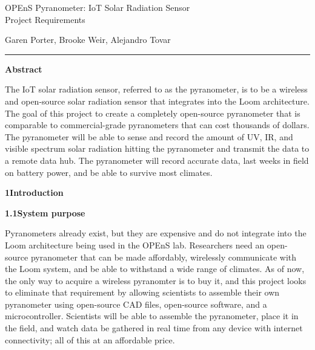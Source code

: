\documentclass[10pt,draftclsnofoot,onecolumn,letterpaper]{article}
\begin{document}
\begin{Center}
{\fontsize{14pt}{16.8pt}\selectfont OPEnS Pyranometer: IoT Solar Radiation Sensor\\ Project Requirements\par}
\end{Center}\par
    
\begin{Center}
Garen Porter, Brooke Weir, Alejandro Tovar\\
\end{Center}\par
\hrule
\begin{Center}
{\fontsize{12pt}{16.8pt}\selectfont \textbf{Abstract}\par}
\end{Center}\par
    
{\fontsize{10pt}{12.0pt}\selectfont The IoT solar radiation sensor, referred to as the pyranometer, is to be a wireless and open-source solar radiation sensor that integrates into the Loom architecture. The goal of this project to create a completely open-source pyranometer that is comparable to commercial-grade pyranometers that can cost thousands of dollars. The pyranometer will be able to sense and record the amount of UV, IR, and visible spectrum solar radiation hitting the pyranometer and transmit the data to a remote data hub. The pyranometer will record accurate data, last weeks in field on battery power, and be able to survive most climates.
\par}\par
    
\newpage
    
    
{\fontsize{12pt}{12.0pt} \textbf{1\quad Introduction}\\\selectfont 
\par}\par
{\fontsize{10pt}{12.0pt} \textbf{1.1\quad System purpose}\\\selectfont 
\par}\par
{\fontsize{10pt}{12.0pt} Pyranometers already exist, but they are expensive and do not integrate into the Loom architecture being used in the OPEnS lab. Researchers need an open-source pyranometer that can be made affordably, wirelessly communicate with the Loom system, and be able to withstand a wide range of climates. As of now, the only way to acquire a wireless pyranomter is to buy it, and this project looks to eliminate that requirement by allowing scientists to assemble their own pyranometer using open-source CAD files, open-source software, and a microcontroller. Scientists will be able to assemble the pyranometer, place it in the field, and watch data be gathered in real time from any device with internet connectivity; all of this at an affordable price.  \\\selectfont 
\par}\par
\end{document}
